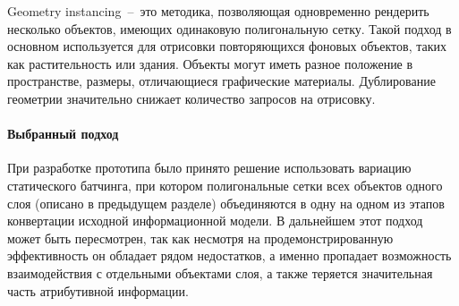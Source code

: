 \begin{enumerate}
{        Geometry instancing~--~это методика, позволяющая
        одновременно рендерить нес\-колько объектов, имеющих
        одинаковую полигональную сетку.
        Такой подход в основном используется для отрисовки
        повторяющихся фоновых объектов, таких как растительность или здания.
        Объекты могут иметь разное положение в пространстве,
        размеры, отличающиеся графические материалы.
        Дублирование геометрии значительно снижает
        количество запросов на отрисовку.
    }
\end{enumerate}

\paragraph{Выбранный подход}

При разработке прототипа было принято решение
использовать вариацию статического батчинга,
при котором полигональные сетки всех объектов одного слоя
(описано в предыдущем разделе)
объединяются в одну на одном из этапов конвертации
исходной информационной модели.
В дальнейшем этот подход может быть пересмотрен,
так как несмотря на продемонстрированную эффективность
он обладает рядом недостатков,
а именно пропадает возможность взаимодействия с
отдельными объектами слоя, а также
теряется значительная часть атрибутивной информации.
